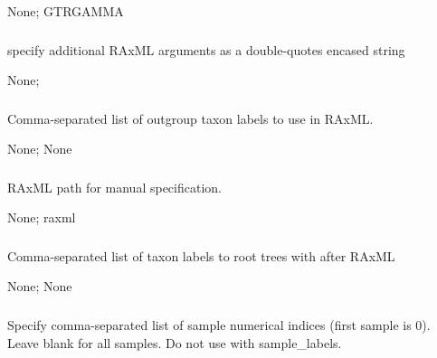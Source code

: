 \documentclass[letterpaper,11pt,english]{sphinxmanual}
\begin{document}
 None;  GTRGAMMA


\subsubsection{}
\label{\detokenize{prog_desc:raxml-opts-raxmlopts}}
 specify additional RAxML arguments as a double-quotes encased string

 None; 


\subsubsection{}
\label{\detokenize{prog_desc:raxml-outgroups-raxmloutgroups}}
 Comma-separated list of outgroup taxon labels to use in RAxML.

 None;  None


\subsubsection{}
\label{\detokenize{prog_desc:id124}}
 RAxML path for manual specification.

 None;  raxml


\subsubsection{}
\label{\detokenize{prog_desc:root-with-rootwith}}
 Comma-separated list of taxon labels to root trees with after RAxML

 None;  None


\subsubsection{}
\label{\detokenize{prog_desc:id125}}
 Specify comma-separated list of sample numerical indices (first sample is 0). Leave blank for all samples. Do not use with \textendash{}sample\_labels.
\end{document}
